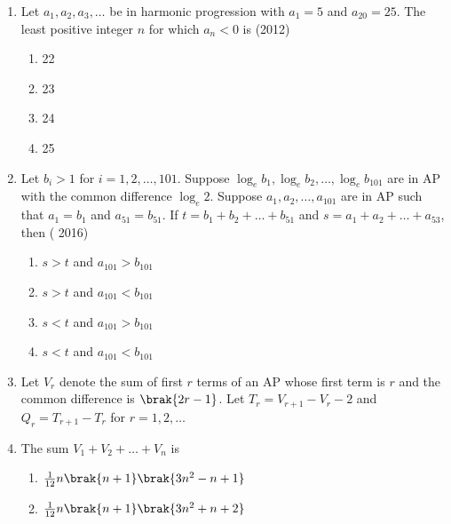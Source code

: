 \begin{enumerate}    [label=\thesubsection.\arabic*, ref=\thesubsection.\theenumi]
\begin{multicols}{4}
         \end{multicols}
%  
\item Let ${a_1, a_2, a_3, \dots}$ be in harmonic progression with ${a_1}=5$ and ${a_{20}}=25$. The least positive integer $n$ for which ${a_n<0}$ is \hfill(2012)
                \begin{multicols}{4}
\begin{enumerate}    
                    \item 22
                    \item 23
                    \item 24
                    \item 25
                    \end{enumerate}
                    \end{multicols}
\item Let ${b_i}>1$ for $i=1, 2, \dots, 101$. Suppose ${\log_e}{b_1}, {\log_e}{b_2}, \dots, {\log_e}{b_{101}}$ are in  AP   with the common difference ${\log_e}2$. Suppose ${a_1, a_2, \dots, a_{101}}$ are in AP such that ${a_1=b_1}$ and ${a_{51}=b_{51}}$. If $t={b_1+b_2+\dots+b_{51}}$ and $s={a_1+a_2+\dots+a_{53}}$,  then \hfill ( 2016)
                    \begin{multicols}{2}
\begin{enumerate}    
%                    
                        \item $s>t$ and ${a_{101}>b_{101}}$
                        \item $s>t$ and ${a_{101}<b_{101}}$
                        \item $s<t$ and ${a_{101}>b_{101}}$
                        \item $s<t$ and ${a_{101}<b_{101}}$
                        \end{enumerate}
                        \end{multicols}
%    
\item[]
 Let $ V_{r} $ denote the sum of first $r$ terms of an  AP   whose first term is $r$ and the common difference is $\brak{2r-1}$. Let $ T_{r}=V_{r+1}-V_{r}-2 $ and $ Q_{r}=T_{r+1}-T_{r}$ for $r=1, 2, \dots$
% 
%
 \item The sum  $  V_{1}+V_{2}+\dots+V_{n} $  is 
% 
	 \hfill {}                            
     \begin{multicols}{2}
\begin{enumerate}    
%         
	     \item $\frac{1}{12}n\brak{n+1}\brak{3n^{2}-n+1}$
	     \item $\frac{1}{12}n\brak{n+1}\brak{3n^{2}+n+2}$

\end{enumerate}
\end{multicols}
\end{enumerate}
